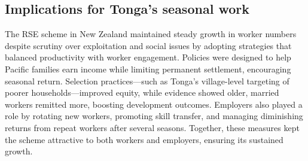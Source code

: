 \documentclass[9pt,a4paper,twocolumn,twoside]{tau-class/tau}
\begin{document}
         
         
         \subsection{Implications for Tonga's seasonal work}
         

        The RSE scheme in New Zealand maintained steady growth in worker numbers despite scrutiny over exploitation and social issues by adopting strategies that balanced productivity with worker engagement. Policies were designed to help Pacific families earn income while limiting permanent settlement, encouraging seasonal return. Selection practices—such as Tonga’s village-level targeting of poorer households—improved equity, while evidence showed older, married workers remitted more, boosting development outcomes. Employers also played a role by rotating new workers, promoting skill transfer, and managing diminishing returns from repeat workers after several seasons. Together, these measures kept the scheme attractive to both workers and employers, ensuring its sustained growth.
        
        
        
         
         
         
         
         
 
\end{document}
